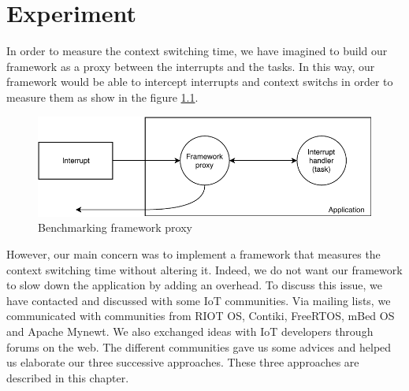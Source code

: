 \chapter{Experiment \label{chap:experiment}}

In order to measure the context switching time, we have imagined to build our framework as a proxy between the interrupts and the tasks.
In this way, our framework would be able to intercept interrupts and context switchs in order to measure them as show in the figure \ref{fig:proxy-framework}.

\begin{figure}[!ht]
  \centering
  \includegraphics[scale=1]{assets/proxy-framework.pdf}
  \caption{Benchmarking framework proxy\label{fig:proxy-framework}}
\end{figure}


However, our main concern was to implement a framework that measures the context switching time without altering it.
Indeed, we do not want our framework to slow down the application by adding an overhead.
To discuss this issue, we have contacted and discussed with some IoT communities.
Via mailing lists, we communicated with communities from RIOT OS, Contiki, FreeRTOS, mBed OS and Apache Mynewt.
We also exchanged ideas with IoT developers through forums on the web.
The different communities gave us some advices and helped us elaborate our three successive approaches.
These three approaches are described in this chapter.



